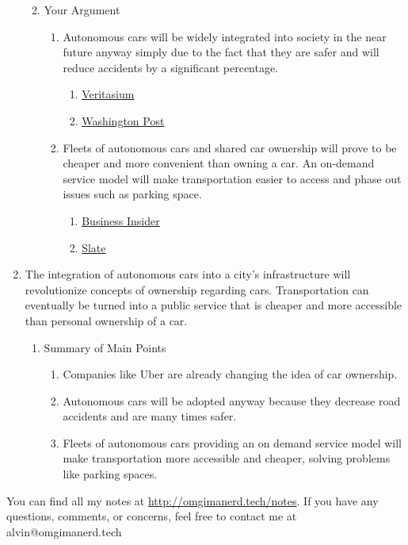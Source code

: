 \documentclass[letterpaper, 12pt]{article}
\begin{document}
\begin{enumerate}
\begin{enumerate}
\begin{enumerate}
\begin{enumerate}
      \end{enumerate}
    \end{enumerate}
    \item Your Argument
    \begin{enumerate}
      \item Autonomous cars will be widely integrated into society in the near
        future anyway simply due to the fact that they are safer and will reduce
        accidents by a significant percentage.
      \begin{enumerate}
        \item \href{https://www.youtube.com/watch?v=WBjY3QGNdAw}{\underline{Veritasium}}
        \item \href{https://www.washingtonpost.com/news/innovations/wp/2017/02/20/the-big-moral-dilemma-facing-self-driving-cars/?utm_term=.802ae11b67c4}{\underline{Washington Post}}
      \end{enumerate}
      \item Fleets of autonomous cars and shared car ownership will prove to be
        cheaper and more convenient than owning a car. An on-demand service
        model will make transportation easier to access and phase out issues
        such as parking space.
      \begin{enumerate}
        \item \href{http://www.businessinsider.com/why-no-one-will-own-a-car-in-25-years-2015-6}{\underline{Business Insider}}
        \item \href{http://www.slate.com/articles/technology/future_tense/2016/10/self_driving_cars_effects_on_cities_depend_on_who_owns_them.html}{\underline{Slate}}
      \end{enumerate}
    \end{enumerate}
  \end{enumerate}
  \item The integration of autonomous cars into a city's infrastructure will
    revolutionize concepts of ownership regarding cars. Transportation can
    eventually be turned into a public service that is cheaper and more
    accessible than personal ownership of a car.
  \begin{enumerate}
    \item Summary of Main Points
    \begin{enumerate}
      \item Companies like Uber are already changing the idea of car ownership.
      \item Autonomous cars will be adopted anyway because they decrease road
        accidents and are many times safer.
      \item Fleets of autonomous cars providing an on demand service model will
        make transportation more accessible and cheaper, solving problems like
        parking spaces.
    \end{enumerate}
  \end{enumerate}
\end{enumerate}

\begin{center}
  You can find all my notes at \url{http://omgimanerd.tech/notes}. If you have
  any questions, comments, or concerns, feel free to contact me at
  alvin@omgimanerd.tech
\end{center}
\end{document}

